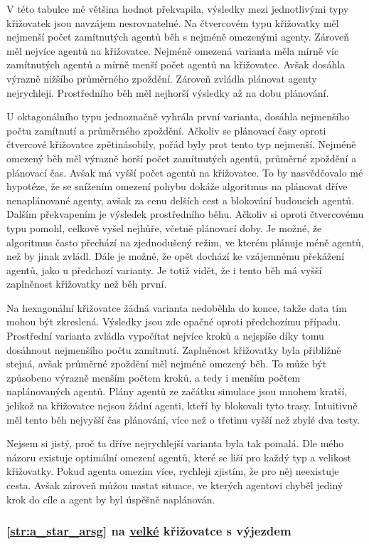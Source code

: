 V této tabulce mě většina hodnot překvapila, výsledky mezi jednotlivými typy křižovatek jsou navzájem nesrovnatelné.
Na čtvercovém typu křižovatky měl nejmenší počet zamítnutých agentů běh s nejméně omezenými agenty.
Zároveň měl nejvíce agentů na křižovatce.
Nejméně omezená varianta měla mírně víc zamítnutých agentů a mírně menší počet agentů na křižovatce.
Avšak dosáhla výrazně nižšího průměrného zpoždění.
Zároveň zvládla plánovat agenty nejrychleji.
Prostředního běh měl nejhorší výsledky až na dobu plánování.

U oktagonálního typu jednoznačně vyhrála první varianta,
dosáhla nejmenšího počtu zamítnutí a průměrného zpoždění.
Ačkoliv se plánovací časy oproti čtvercové křižovatce zpětinásobily, pořád byly prot tento typ nejmenší.
Nejméně omezený běh měl výrazně horší počet zamítnutých agentů, průměrné zpoždění a plánovací čas.
Avšak má vyšší počet agentů na křižovatce.
To by nasvědčovalo mé hypotéze, že se snížením omezení pohybu dokáže algoritmus na plánovat dříve nenaplánované agenty,
avšak za cenu delších cest a blokování budoucích agentů.
Dalším překvapením je výsledek prostředního běhu.
Ačkoliv si oproti čtvercovému typu pomohl, celkově vyšel nejhůře, včetně plánovací doby.
Je možné, že algoritmus často přechází na zjednodušený režim, ve kterém plánuje méně agentů, než by jinak zvládl.
Dále je možné, že opět dochází ke vzájemnému překážení agentů, jako u předchozí varianty.
Je totiž vidět, že i tento běh má vyšší zaplněnost křižovatky než běh první.

Na hexagonální křižovatce žádná varianta nedoběhla do konce, takže data tím mohou být zkreslená.
Výsledky jsou zde opačné oproti předchozímu případu.
Prostřední varianta zvládla vypočítat nejvíce kroků a nejspíše díky tomu dosáhnout nejmenšího počtu zamítnutí.
Zaplněnost křižovatky byla přibližně stejná, avšak průměrné zpoždění měl nejméně omezený běh.
To může být způsobeno výrazně menším počtem kroků, a tedy i menším počtem naplánovaných agentů.
Plány agentů ze začátku simulace jsou mnohem kratší,
jelikož na křižovatce nejsou žádní agenti, kteří by blokovali tyto trasy.
Intuitivně měl tento běh nejvyšší čas plánování, více než o třetinu vyšší než zbylé dva testy.

Nejsem si jistý, proč ta dříve nejrychlejší varianta byla tak pomalá.
Dle mého názoru existuje optimální omezení agentů, které se liší pro každý typ a velikost křižovatky.
Pokud agenta omezím více, rychleji zjistím, že pro něj neexistuje cesta.
Avšak zároveň můžou nastat situace, ve kterých agentovi chyběl jediný krok do cíle
a agent by byl úspěšně naplánován.


\subsubsection{\ref{str:a_star_arsg} na \hyperref[par:data_velka]{velké} křižovatce s výjezdem}
\label{subsubsec:exp_arsg_velka_krizovatka_s_vyjezdem}